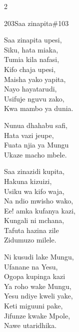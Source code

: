 \documentclass{article}
\begin{document}
\begin{multicols}{2}
\begin{hymn}{203}{Saa zinapita}{\#103}
\begin{stanza}
Saa zinapita upesi,\\
Siku, hata miaka,\\
Tumia kila nafasi,\\
Kifo chaja upesi,\\
Maisha yako yapita,\\
Nayo hayatarudi,\\
Usifuje nguvu zako,\\
Kwa mambo ya dunia.
\end{stanza}
\begin{chorus}
Nunua dhahabu safi,\\
Hata vazi jeupe,\\
Fuata njia ya Mungu\\
Ukaze macho mbele.
\end{chorus}
\begin{stanza}
Saa zinazidi kupita,\\
Hakuna kizuizi,\\
Usiku wa kifo waja,\\
Na ndio mwisho wako,\\
Ee! amka kufanya kazi,\\
Kungali ni mchana,\\
Tafuta hazina zile\\
Zidumuzo milele.
\end{stanza}
\begin{stanza}
Ni kusudi lake Mungu,\\
Ufanane na Yesu,\\
Ogopa kupinga kazi\\
Ya roho wake Mungu,\\
Yesu ndiye kweli yake,\\
Keti miguuni pake,\\
Jifunze kwake Mpole,\\
Nawe utaridhika.
\end{stanza}
\end{hymn}


\end{multicols}
\end{document}

